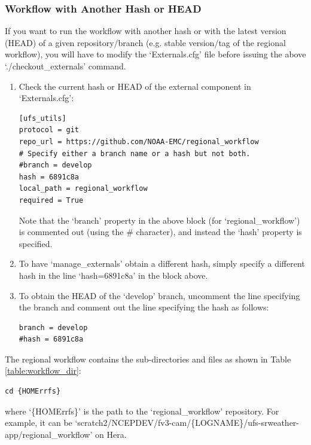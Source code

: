 \documentclass[11pt,fleqn]{report}              %
\begin{document}
\subsubsection{Workflow with Another Hash or HEAD}

If you want to run the workflow with another hash or with the latest version (HEAD) of a given repository/branch (e.g. stable version/tag of the regional workflow), you will have to modify the `Externals.cfg' file before issuing the above `./checkout\_externals' command. 

\begin{enumerate}
\item Check the current hash or HEAD of the external component in `Externals.cfg':
\lstset{language=bash}   
\begin{lstlisting}[frame=trBL]
[ufs_utils]
protocol = git
repo_url = https://github.com/NOAA-EMC/regional_workflow
# Specify either a branch name or a hash but not both.
#branch = develop
hash = 6891c8a
local_path = regional_workflow
required = True
\end{lstlisting}
Note that the `branch' property in the above block (for `regional\_workflow') is commented out (using the \# character), and instead the `hash' property is specified.

\item To have `manage\_externals' obtain a different hash, simply specify a different hash in the line `hash=6891c8a' in the block above. 

\item To obtain the HEAD of the `develop' branch, uncomment the line specifying the branch and comment out the line specifying the hash as follows:
\lstset{language=bash}   
\begin{lstlisting}[frame=trBL]
branch = develop
#hash = 6891c8a
\end{lstlisting}

\end{enumerate}


The regional workflow contains the sub-directories and files as shown in Table \ref{table:workflow_dir}:
\lstset{language=bash}   
\begin{lstlisting}[frame=trBL]
cd {HOMErrfs}
\end{lstlisting}
where `\{HOMErrfs\}' is the path to the `regional\_workflow' repository. For example, it can be `scratch2/NCEPDEV/fv3-cam/\{LOGNAME\}/ufs-srweather-app/regional\_workflow' on Hera.
\end{document}
